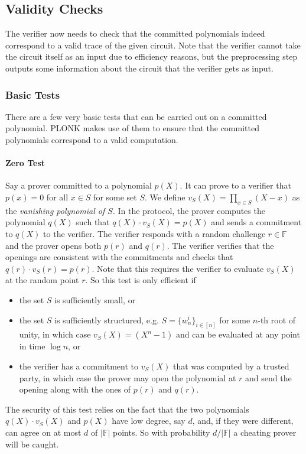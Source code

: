 \documentclass[final]{zamarep}
\newcommand{\field}{\mathbb{F}}
\newcommand{\abs}[1]{\lvert #1 \rvert}
\begin{document}
\subsection{Validity Checks}
\label{sec:checks}
The verifier now needs to check that the committed polynomials indeed correspond to a valid trace of the given circuit. Note that the verifier cannot take the circuit itself as an input due to efficiency reasons, but the preprocessing step outputs some information about the circuit that the verifier gets as input. 

\subsubsection{Basic Tests}
\label{sec:basic}
There are a few very basic tests that can be carried out on a committed polynomial. PLONK makes use of them to ensure that the committed polynomials correspond to a valid computation.

\paragraph{Zero Test}
Say a prover committed to a polynomial $p(X)$. It can prove to a verifier that $p(x) = 0$ for all $x \in S$ for some set $S$. We define $v_S(X) = \prod_{x \in S} (X - x)$ as the \emph{vanishing polynomial of $S$}. In the protocol, the prover computes the polynomial $q(X)$ such that $q(X) \cdot v_S(X) = p(X)$ and sends a commitment to $q(X)$ to the verifier. The verifier responds with a random challenge $r \in \field$ and the prover opens both $p(r)$ and $q(r)$. The verifier verifies that the openings are consistent with the commitments and checks that $q(r) \cdot v_S(r) = p(r)$. Note that this requires the verifier to evaluate $v_S(X)$ at the random point $r$. So this test is only efficient if
\begin{itemize}
\item the set $S$ is sufficiently small, or
\item the set $S$ is sufficiently structured, e.g. $S = \{w_n^i\}_{i \in [n]}$ for some $n$-th root of unity, in which case $v_S(X) = (X^n - 1)$ and can be evaluated at any point in time $\log n$, or
\item the verifier has a commitment to $v_S(X)$ that was computed by a trusted party, in which case the prover may open the polynomial at $r$ and send the opening along with the ones of $p(r)$ and $q(r)$. 
\end{itemize}
The security of this test relies on the fact that the two polynomials $q(X) \cdot v_S(X)$ and  $p(X)$ have low degree, say $d$, and, if they were different, can agree on at most $d$ of $\abs{\field}$ points. So with probability $d/\abs{\field}$ a cheating prover will be caught.
\end{document}
